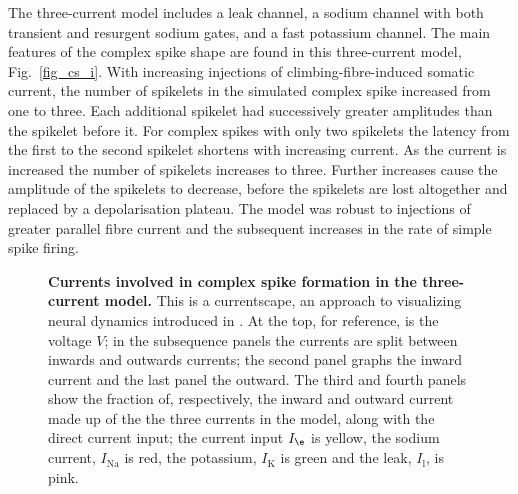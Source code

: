 \documentclass[twocolumn]{svjour3}          %
\newcommand{\mse}{\,\mathrm{ms}}
\renewcommand{\k}{\mathrm{K}}
\newcommand{\na}{\mathrm{Na}}
\newcommand{\leak}{\mathrm{l}}
\begin{document}

The three-current model includes a leak channel, a sodium channel with
both transient and resurgent sodium gates, and a fast potassium
channel. The main features of the complex spike shape are found in
this three-current model, Fig.~\ref{fig_cs_i}. With
increasing injections of climbing-fibre-induced somatic current, the
number of spikelets in the simulated complex spike increased from one
to three. Each additional spikelet had successively greater amplitudes
than the spikelet before it. For complex spikes with only two
spikelets the latency from the first to the second spikelet shortens
with increasing current. As the current is increased the number of
spikelets increases to three. Further increases cause the amplitude of
the spikelets to decrease, before the spikelets are lost altogether
and replaced by a depolarisation plateau. The model was robust to
injections of greater parallel fibre current and the subsequent
increases in the rate of simple spike firing.




\begin{figure}[!ht]
  
  \caption{\textbf{Currents involved in complex spike formation in the
      three-current model.} This is a currentscape, an approach to
    visualizing neural dynamics introduced in
    \cite{AlonsoMarder2019}. At the top, for reference, is the voltage
    $V$; in the subsequence panels the currents are split between
    inwards and outwards currents; the second panel graphs the inward
    current and the last panel the outward. The third and fourth
    panels show the fraction of, respectively, the inward and outward
    current made up of the the three currents in the model, along with
    the direct current input; the current input $I_{\e}$ is yellow,
    the sodium current, $I_{\na}$ is red, the potassium, $I_{\k}$ is
    green and the leak, $I_{\leak}$, is pink.}
\label{currents_3}
\end{figure}
\end{document}
